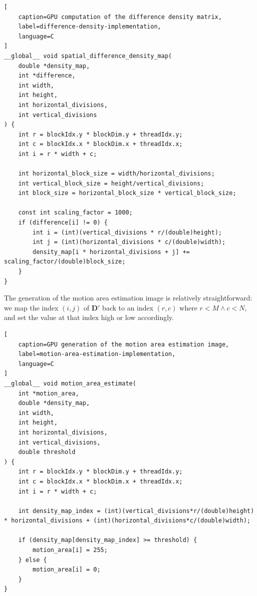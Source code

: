 \documentclass[journal]{IEEEtran}
\begin{document}
\begin{lstlisting}[
	caption=GPU computation of the difference density matrix,
	label=difference-density-implementation,
	language=C
]
__global__ void spatial_difference_density_map(
	double *density_map,
	int *difference,
	int width,
	int height,
	int horizontal_divisions,
	int vertical_divisions
) {
	int r = blockIdx.y * blockDim.y + threadIdx.y;
	int c = blockIdx.x * blockDim.x + threadIdx.x;
	int i = r * width + c;
	
	int horizontal_block_size = width/horizontal_divisions;
	int vertical_block_size = height/vertical_divisions;
	int block_size = horizontal_block_size * vertical_block_size;
	
	const int scaling_factor = 1000;
	if (difference[i] != 0) {
		int i = (int)(vertical_divisions * r/(double)height);
		int j = (int)(horizontal_divisions * c/(double)width);
		density_map[i * horizontal_divisions + j] += scaling_factor/(double)block_size;
	}
}
\end{lstlisting}
The generation of the motion area estimation image is relatively straightforward: we map the index $(i, j)$ of $\boldsymbol{D}'$ back to an index $(r, c)$ where $r < M \wedge c < N$, and set the value at that index high or low accordingly.
\begin{lstlisting}[
	caption=GPU generation of the motion area estimation image,
	label=motion-area-estimation-implementation,
	language=C
]
__global__ void motion_area_estimate(
	int *motion_area,
	double *density_map,
	int width,
	int height,
	int horizontal_divisions,
	int vertical_divisions,
	double threshold
) {
	int r = blockIdx.y * blockDim.y + threadIdx.y;
	int c = blockIdx.x * blockDim.x + threadIdx.x;
	int i = r * width + c;
	
	int density_map_index = (int)(vertical_divisions*r/(double)height) * horizontal_divisions + (int)(horizontal_divisions*c/(double)width);

	if (density_map[density_map_index] >= threshold) {
		motion_area[i] = 255;
	} else {
		motion_area[i] = 0;
	}
}
\end{lstlisting}
\end{document}
